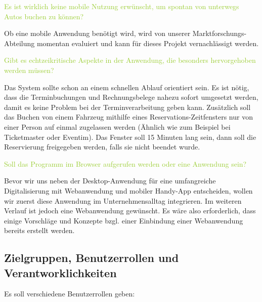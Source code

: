 \textcolor{YellowGreen}{Es ist wirklich keine mobile Nutzung erwünscht, um spontan von unterwegs Autos buchen zu können?}

\textcolor{NavyBlue}{Ob eine mobile Anwendung benötigt wird, wird von unserer Marktforschungs-Abteilung momentan evaluiert und kann für dieses Projekt vernachlässigt werden.}

\textcolor{YellowGreen}{Gibt es echtzeikritische Aspekte in der Anwendung, die besonders hervorgehoben werden müssen?}

\textcolor{NavyBlue}{Das System sollte schon an einem schnellen Ablauf orientiert sein. Es ist nötig, dass die Terminbuchungen und Rechnungsbelege nahezu sofort umgesetzt werden, damit es keine Problem bei der Terminverarbeitung geben kann. Zusätzlich soll das Buchen von einem Fahrzeug mithilfe eines Reservations-Zeitfensters nur von einer Person auf einmal zugelassen werden (Ähnlich wie zum Beispiel bei Ticketmaster oder Eventim). Das Fenster soll 15 Minuten lang sein, dann soll die Reservierung freigegeben werden, falls sie nicht beendet wurde. }

\textcolor{YellowGreen}{Soll das Programm im Browser aufgerufen werden oder eine Anwendung sein?}

\textcolor{NavyBlue}{Bevor wir uns neben der Desktop-Anwendung für eine umfangreiche Digitalisierung mit Webanwendung und mobiler Handy-App entscheiden, wollen wir zuerst diese Anwendung im Unternehmensalltag integrieren. Im weiteren Verlauf ist jedoch eine Webanwendung gewünscht. Es wäre also erforderlich, dass einige Vorschläge und Konzepte bzgl. einer Einbindung einer Webanwendung bereits erstellt werden.}

\subsection{Zielgruppen, Benutzerrollen und Verantworklichkeiten}

Es soll verschiedene Benutzerrollen geben: 


